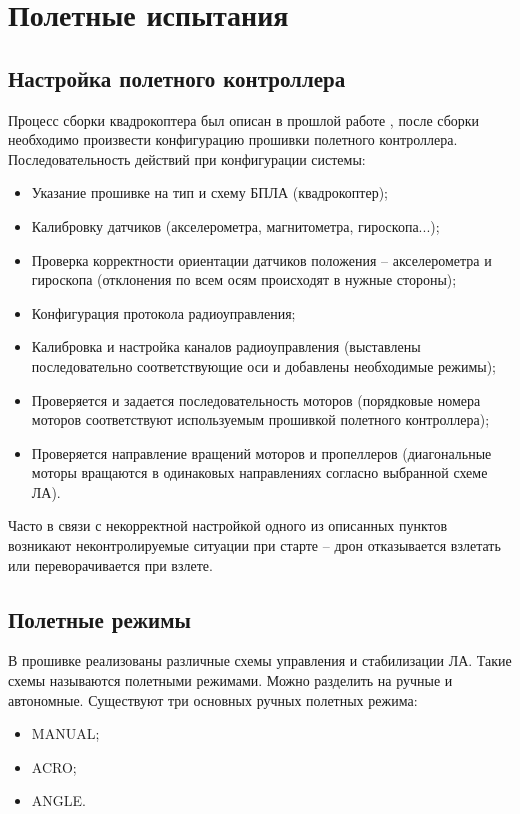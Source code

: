 
\section{Полетные испытания}
\subsection{Настройка полетного контроллера}
Процесс сборки квадрокоптера был описан в прошлой работе \cite{nir}, после сборки необходимо произвести конфигурацию прошивки полетного контроллера.
Последовательность действий при конфигурации системы:
\begin{itemize}
	\item Указание прошивке на тип и схему БПЛА (квадрокоптер);
	\item Калибровку датчиков (акселерометра, магнитометра, гироскопа...);
	\item Проверка корректности ориентации датчиков положения -- акселерометра и гироскопа (отклонения по всем осям происходят в нужные стороны);
	\item Конфигурация протокола радиоуправления;
	\item Калибровка и настройка каналов радиоуправления (выставлены последовательно соответствующие оси и добавлены необходимые режимы);
	\item Проверяется и задается последовательность моторов (порядковые номера моторов соответствуют используемым прошивкой полетного контроллера);
	\item Проверяется направление вращений моторов и пропеллеров (диагональные моторы вращаются в одинаковых направлениях согласно выбранной схеме ЛА).
\end{itemize}

Часто в связи с некорректной настройкой одного из описанных пунктов возникают неконтролируемые ситуации при старте -- дрон отказывается взлетать или переворачивается при взлете.

\subsection{Полетные режимы}
В прошивке реализованы различные схемы управления и стабилизации ЛА.
Такие схемы называются полетными режимами. Можно разделить на ручные и автономные.
Существуют три основных ручных полетных режима:

\begin{itemize}
	\item MANUAL;
	\item ACRO;
	\item ANGLE.
\end{itemize}

